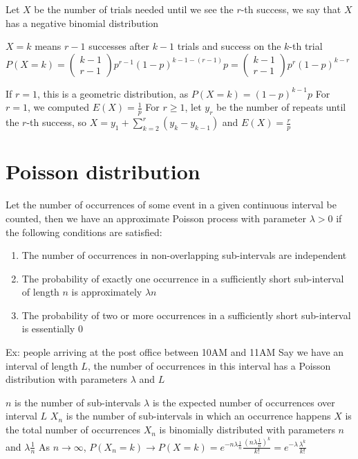 \documentclass{article}
\begin{document}
Let $X$ be the number of trials needed until we see the $r$-th success, we say that $X$ has a negative binomial distribution

$X=k$ means $r-1$ successes after $k-1$ trials and success on the $k$-th trial
$P(X=k)=\begin{pmatrix}
    k-1\\
    r-1
\end{pmatrix}p^{r-1}(1-p)^{k-1-(r-1)}p=\begin{pmatrix}
    k-1\\
    r-1
\end{pmatrix}p^r(1-p)^{k-r}$

If $r=1$, this is a geometric distribution, as $P(X=k)=(1-p)^{k-1}p$
For $r=1$, we computed $E(X)=\frac{1}{p}$
For $r\ge1$, let $y_r$ be the number of repeats until the $r$-th success, so $X=y_1+\sum_{k=2}^r(y_k-y_{k-1})$ and $E(X)=\frac{r}{p}$

\section{Poisson distribution}

Let the number of occurrences of some event in a given continuous interval be counted, then we have an approximate Poisson process with parameter $\lambda>0$ if the following conditions are satisfied:
\begin{enumerate}
    \item The number of occurrences in non-overlapping sub-intervals are independent
    \item The probability of exactly one occurrence in a sufficiently short sub-interval of length $n$ is approximately $\lambda n$
    \item The probability of two or more occurrences in a sufficiently short sub-interval is essentially $0$
\end{enumerate}

Ex: people arriving at the post office between 10AM and 11AM
Say we have an interval of length $L$, the number of occurrences in this interval has a Poisson distribution with parameters $\lambda$ and $L$

$n$ is the number of sub-intervals
$\lambda$ is the expected number of occurrences over interval $L$
$X_n$ is the number of sub-intervals in which an occurrence happens
$X$ is the total number of occurrences
$X_n$ is binomially distributed with parameters $n$ and $\lambda\frac{1}{n}$
As $n\to\infty$, $P(X_n=k)\to P(X=k)=e^{-n\lambda\frac{1}{n}}\frac{(n\lambda\frac{1}{n})^k}{k!}=e^{-\lambda}\frac{\lambda^k}{k!}$
\end{document}
